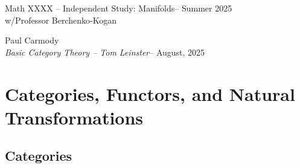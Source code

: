 \documentclass[12pt,a4paper]{report}
\newcommand{\CLASSNAME}{Math XXXX -- Independent Study: Manifolds}
\newcommand{\STUDENTNAME}{Paul Carmody}
\newcommand{\ASSIGNMENT}{\textit{Basic Category Theory -- Tom Leinster}}
\newcommand{\DUEDATE}{August, 2025}
\newcommand{\PROFESSOR}{Professor Berchenko-Kogan}
\newcommand{\SEMESTER}{Summer 2025}
\begin{document}
\begin{center}
	\Large{\CLASSNAME -- \SEMESTER} \\
	\large{ w/\PROFESSOR}
\end{center}
\begin{center}
	\STUDENTNAME \\
	\ASSIGNMENT -- \DUEDATE\\
\end{center} 

\chapter{Categories, Functors, and Natural Transformations}

\section{Categories}
\end{document}
